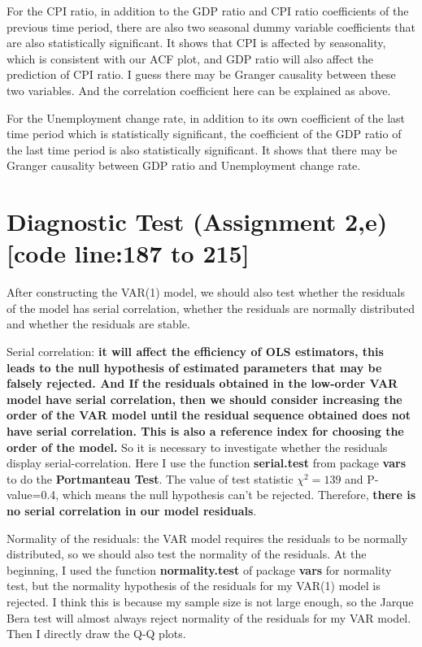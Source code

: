 \documentclass{report}
\begin{document}
For the CPI ratio, in addition to the GDP ratio and CPI ratio coefficients of the previous time period, there are also two seasonal dummy variable coefficients that are also statistically significant. It shows that CPI is affected by seasonality, which is consistent with our ACF plot, and GDP ratio will also affect the prediction of CPI ratio. I guess there may be Granger causality between these two variables. And the correlation coefficient here can be explained as above.

For the Unemployment change rate, in addition to its own coefficient of the last time period which is statistically significant, the coefficient of the GDP ratio of the last time period is also statistically significant. It shows that there may be Granger causality between GDP ratio and Unemployment change rate.

\section{Diagnostic Test (Assignment 2,e) [code line:187 to 215]}

After constructing the VAR(1) model, we should also test whether the residuals of the model has serial correlation, whether the residuals are normally distributed and whether the residuals are stable.

Serial correlation: \textbf{it will affect the efficiency of OLS estimators, this leads to the null hypothesis of estimated parameters that may be falsely rejected. And If the residuals obtained in the low-order VAR model have serial correlation, then we should consider increasing the order of the VAR model until the residual sequence obtained does not have serial correlation. This is also a reference index for choosing the order of the model.} So it is necessary to investigate whether the residuals display serial-correlation. Here I use the function \textbf{serial.test} from package \textbf{vars} to do the \textbf{Portmanteau Test}. The value of test statistic $\chi^2=139$ and P-value=0.4, which means the null hypothesis can't be rejected. Therefore, \textbf{there is no serial correlation in our model residuals}.

Normality of the residuals: the VAR model requires the residuals to be normally distributed, so we should also test the normality of the residuals. At the beginning, I used the function \textbf{normality.test} of package \textbf{vars} for normality test, but  the normality hypothesis of the residuals for my VAR(1) model is rejected. I think this is because my sample size is not large enough, so the Jarque Bera test will almost always reject normality of the residuals for my VAR model. Then I directly draw the Q-Q plots.
\end{document}
